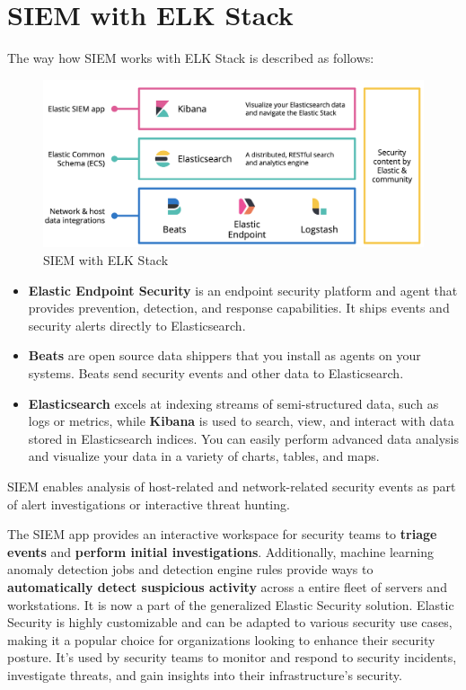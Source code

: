 \documentclass{report}
\begin{document}
\section{SIEM with ELK Stack}
The way how SIEM works with ELK Stack is described as follows:
\begin{figure}[ht]
	\centering
	\includegraphics[width=\textwidth]{Images/SIEM.png}
	\caption{SIEM with ELK Stack}
	\label{fig:SIEM with ELK Stack}
\end{figure}

\begin{itemize}
	\item \textbf{Elastic Endpoint Security} is an endpoint security platform and agent that provides prevention, detection, 
	and response capabilities. It ships events and security alerts directly to Elasticsearch.
	\item \textbf{Beats} are open source data shippers that you install as agents on your systems. 
	Beats send security events and other data to Elasticsearch.
	\item \textbf{Elasticsearch} excels at indexing streams of semi-structured data, 
	such as logs or metrics, while \textbf{Kibana} is used to search, view, and interact with data stored in Elasticsearch indices. 
	You can easily perform advanced data analysis and visualize your data in a variety of charts, tables, and maps.
\end{itemize}

SIEM enables analysis of host-related and network-related security events as part of 
alert investigations or interactive threat hunting.

The SIEM app provides an interactive workspace for security teams to \textbf{triage events} 
and \textbf{perform initial investigations}. 
Additionally, machine learning anomaly detection jobs and detection engine rules provide ways to 
\textbf{automatically detect suspicious activity} across a entire fleet of servers and workstations. 
It is now a part of the generalized Elastic Security solution. 
Elastic Security is highly customizable and can be adapted to various security use cases, 
making it a popular choice for organizations looking to enhance their security posture. 
It's used by security teams to monitor and respond to security incidents, 
investigate threats, and gain insights into their infrastructure's security.
\end{document}
